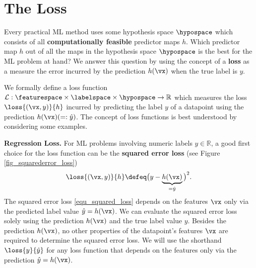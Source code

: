 \documentclass[12pt]{report}
\begin{document}
\section{The Loss}
\label{sec_lossfct}

Every practical ML method uses some hypothesis space $\hypospace$ 
which consists of all {\bf computationally feasible} predictor maps $h$. 
Which predictor map $h$ out of all the maps in the hypothesis space 
$\hypospace$ is the best for the ML problem at hand? We answer this 
question by using the concept of a {\bf loss} as a measure the error  
incurred by the prediction $h(\vx)$ when the true label is $y$. 

We formally define a loss function $\mathcal{L}: \featurespace \times \labelspace \times \hypospace \rightarrow \mathbb{R}$ 
which measures the loss $\loss{(\vx,y)}{h}$ incurred by predicting the 
label $y$ of a datapoint using the prediction $h(\vx)(=: \hat{y})$. 
The concept of loss functions is best understood by considering 
some examples. 

{\bf Regression Loss.} For ML problems involving numeric labels $y \in \mathbb{R}$, 
a good first choice for the loss function can be the {\bf squared error loss} (see Figure \ref{fig_squarederror_loss}) 
\begin{equation} 
\label{equ_squared_loss}
\loss{(\vx,y)}{h} \defeq \big(y - \underbrace{h(\vx)}_{=\hat{y}} \big)^{2}. 
\end{equation} 
The squared error loss \eqref{equ_squared_loss} depends on the 
features $\vx$ only via the predicted label value $\hat{y}= h(\vx)$. 
We can evaluate the squared error loss solely using the prediction $h(\vx)$ 
and the true label value $y$. Besides the prediction $h(\vx)$, no other 
properties of the datapoint's features $\vx$ are required to determine 
the squared error loss. We will use the shorthand $\loss{y}{\hat{y}}$ 
for any loss function that depends on the features only via the 
prediction $\hat{y}=h(\vx)$. 
\end{document}
